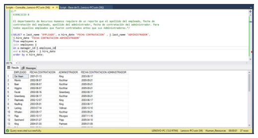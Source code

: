 \begin{enumerate}[1.]
	\begin{center}
	\includegraphics[width=17cm]{./Imagenes/Actividad8-Ejercicio08} 
	\end{center}

	\end{enumerate}
	


